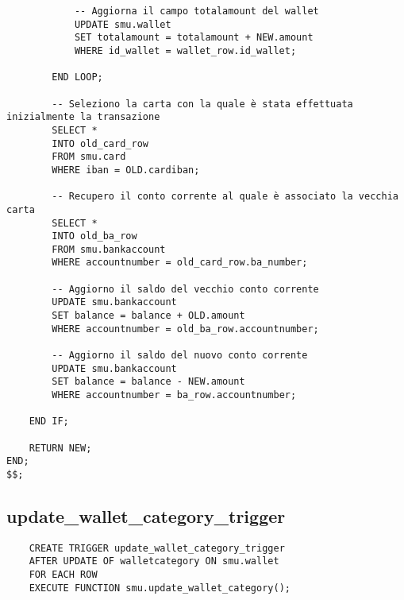 \begin{lstlisting}
            -- Aggiorna il campo totalamount del wallet
            UPDATE smu.wallet
            SET totalamount = totalamount + NEW.amount
            WHERE id_wallet = wallet_row.id_wallet;

        END LOOP;        

        -- Seleziono la carta con la quale è stata effettuata inizialmente la transazione
        SELECT *
        INTO old_card_row
        FROM smu.card
        WHERE iban = OLD.cardiban;

        -- Recupero il conto corrente al quale è associato la vecchia carta
        SELECT *
        INTO old_ba_row
        FROM smu.bankaccount
        WHERE accountnumber = old_card_row.ba_number;

        -- Aggiorno il saldo del vecchio conto corrente
        UPDATE smu.bankaccount
        SET balance = balance + OLD.amount
        WHERE accountnumber = old_ba_row.accountnumber;

        -- Aggiorno il saldo del nuovo conto corrente
        UPDATE smu.bankaccount
        SET balance = balance - NEW.amount
        WHERE accountnumber = ba_row.accountnumber;

    END IF;

    RETURN NEW;
END;
$$;
\end{lstlisting}

\newpage

\subsection{update\_wallet\_category\_trigger}

\begin{lstlisting}
    CREATE TRIGGER update_wallet_category_trigger 
    AFTER UPDATE OF walletcategory ON smu.wallet 
    FOR EACH ROW 
    EXECUTE FUNCTION smu.update_wallet_category();
\end{lstlisting}

